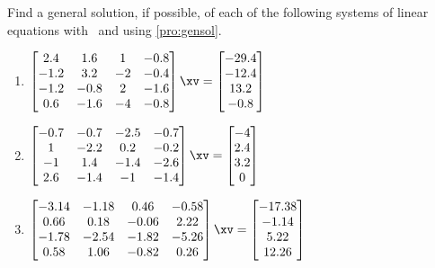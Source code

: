 \begin{exercise} \label{ex:} 
Find a general solution, if possible, of each of the following systems of linear equations with \script\ and using \autoref{pro:gensol}.
\begin{enumerate}
\itemsep=3ex %
\item \(\begin{bmatrix} 2.4&1.6&1&-0.8
\\-1.2&3.2&-2&-0.4
\\-1.2&-0.8&2&-1.6
\\0.6&-1.6&-4&-0.8 \end{bmatrix}\xv
=\begin{bmatrix} -29.4
\\-12.4
\\13.2
\\-0.8 \end{bmatrix}\)
\setbox\ajrqrbox\hbox{}%
\marginpar{\usebox{\ajrqrbox\\[2ex]}}%


\item \(\begin{bmatrix} -0.7&-0.7&-2.5&-0.7
\\1&-2.2&0.2&-0.2
\\-1&1.4&-1.4&-2.6
\\2.6&-1.4&-1&-1.4 \end{bmatrix}\xv
=\begin{bmatrix} -4
\\2.4
\\3.2
\\0 \end{bmatrix}\)
\setbox\ajrqrbox\hbox{}%
\marginpar{\usebox{\ajrqrbox\\[2ex]}}%


\item \(\begin{bmatrix} -3.14&-1.18&0.46&-0.58
\\0.66&0.18&-0.06&2.22
\\-1.78&-2.54&-1.82&-5.26
\\0.58&1.06&-0.82&0.26 \end{bmatrix}\xv
=\begin{bmatrix} -17.38
\\-1.14
\\5.22
\\12.26 \end{bmatrix}\)
\setbox\ajrqrbox\hbox{}%
\marginpar{\usebox{\ajrqrbox\\[2ex]}}%



\end{enumerate}
\end{exercise}
